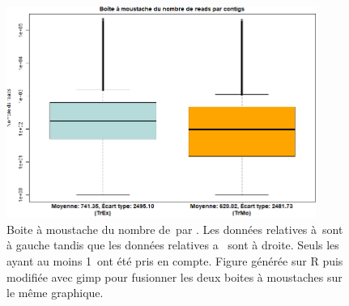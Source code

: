 \documentclass[../main]{subfiles} %
\begin{document}
\addto\extrasfrench{\protected\edef:{\unexpanded\expandafter{:}}}

\begin{figure}[ht]
    \centering
    \includegraphics[width=0.9\textwidth]{../Illustrations/boxplotTr.png}
    \caption{Boite à moustache du nombre de \reads\,par \contigs. Les données relatives à \BamTrEx\,sont à gauche tandis que les données relatives a \BamTrMo\, sont à droite. Seuls les \contigs\,ayant au moins 1 \reads\,ont été pris en compte. Figure générée sur \gls{R} puis modifiée avec \gls{gimp} pour fusionner les deux boites à moustaches sur le même graphique.}
    \label{fig:BoxPlotContigs}
\end{figure}


\end{document}

